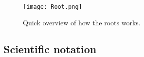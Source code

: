 \documentclass{article} %
\begin{document}
\begin{figure}[H]
    \centering
    \texttt{[image: Root.png]}
    \caption{Quick overview of how the roots works.}
    \label{fig:etiqueta}
\end{figure}

\subsection{Scientific notation}
\end{document}
